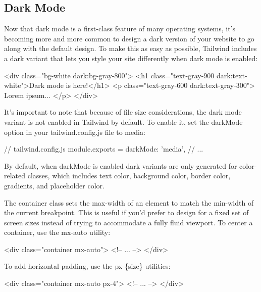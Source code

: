 \documentclass{report}
\begin{document}
    \bigbreak \noindent 
    \subsection{Dark Mode}
    \bigbreak \noindent 
    Now that dark mode is a first-class feature of many operating systems, it’s becoming more and more common to design a dark version of your website to go along with the default design.
    \bigbreak \noindent 
    To make this as easy as possible, Tailwind includes a dark variant that lets you style your site differently when dark mode is enabled:

    \bigbreak \noindent 
    \begin{htmlcode}
<div class="bg-white dark:bg-gray-800">
  <h1 class="text-gray-900 dark:text-white">Dark mode is here!</h1>
  <p class="text-gray-600 dark:text-gray-300">
    Lorem ipsum...
  </p>
</div>
    \end{htmlcode}
    \bigbreak \noindent 
    It’s important to note that because of file size considerations, the dark mode variant is not enabled in Tailwind by default.
    \bigbreak \noindent 
    To enable it, set the darkMode option in your tailwind.config.js file to media:
    \bigbreak \noindent 
    \begin{cppcode}
        // tailwind.config.js
        module.exports = {
            darkMode: 'media',
            // ...
        }
    \end{cppcode}
    \bigbreak \noindent 
    By default, when darkMode is enabled dark variants are only generated for color-related classes, which includes text color, background color, border color, gradients, and placeholder color.

    \pagebreak 
    \bigbreak \noindent 
    The container class sets the max-width of an element to match the min-width of the current breakpoint. This is useful if you’d prefer to design for a fixed set of screen sizes instead of trying to accommodate a fully fluid viewport.
    \bigbreak \noindent 
    To center a container, use the mx-auto utility:
    \bigbreak \noindent 
    \begin{htmlcode}
        <div class="container mx-auto">
            <!-- ... -->
        </div>
    \end{htmlcode}
    \bigbreak \noindent 
    To add horizontal padding, use the px-\{size\} utilities:
    \bigbreak \noindent 
    \begin{htmlcode}
    <div class="container mx-auto px-4">
      <!-- ... -->
    </div>
    \end{htmlcode}
\end{document}
